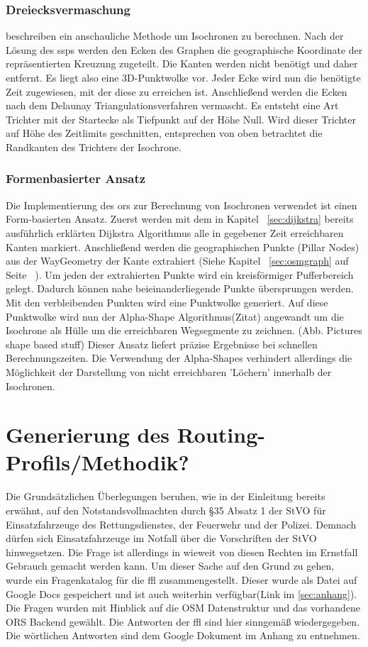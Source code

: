 \documentclass[12pt,a4paper]{article}
\begin{document}
\subsubsection{Dreiecksvermaschung}
\cite{isochrones} beschreiben ein anschauliche Methode um Isochronen zu berechnen. 
Nach der Lösung des \gls{ssp}s werden den Ecken des Graphen die geographische Koordinate der repräsentierten Kreuzung zugeteilt. Die Kanten werden nicht benötigt und daher entfernt. 
Es liegt also eine 3D-Punktwolke vor. 
Jeder Ecke wird nun die benötigte Zeit zugewiesen, mit der diese zu erreichen ist. 
Anschließend werden die Ecken nach dem Delaunay Triangulationsverfahren vermascht. 
Es entsteht eine Art Trichter mit der Startecke als Tiefpunkt auf der Höhe Null. 
Wird dieser Trichter auf Höhe des Zeitlimits geschnitten, entsprechen von oben betrachtet die Randkanten des Trichters der Isochrone.


\subsubsection{Formenbasierter Ansatz}
Die Implementierung des \gls{ors} zur Berechnung von Isochronen verwendet ist einen Form-basierten Ansatz. Zuerst werden mit dem in Kapitel ~\ref{sec:dijkstra} bereits ausführlich erklärten Dijkstra Algorithmus alle in gegebener Zeit erreichbaren Kanten markiert. Anschließend werden die geographischen Punkte (Pillar Nodes) aus der WayGeometry der Kante extrahiert (Siehe Kapitel ~\ref{sec:osmgraph} auf Seite ~\pageref{sec:osmgraph}). Um jeden der extrahierten Punkte wird ein kreisförmiger Pufferbereich gelegt. Dadurch können nahe beieinanderliegende Punkte übersprungen werden. Mit den verbleibenden Punkten wird eine Punktwolke generiert. Auf diese Punktwolke wird nun der Alpha-Shape Algorithmus(Zitat) angewandt um die Isochrone als Hülle um die erreichbaren Wegsegmente zu zeichnen.
(Abb. Pictures shape based stuff)
Dieser Ansatz liefert präzise Ergebnisse bei schnellen Berechnungszeiten. Die Verwendung der Alpha-Shapes verhindert allerdings die Möglichkeit der Darstellung von nicht erreichbaren 'Löchern' innerhalb der Isochronen.

\newpage
\section{Generierung des Routing-Profils/Methodik?}
Die Grundsätzlichen Überlegungen beruhen, wie in der Einleitung bereits erwähnt, auf den Notstandsvollmachten durch §35 Absatz 1 der StVO für Einsatzfahrzeuge des Rettungsdienstes, der Feuerwehr und der Polizei. Demnach dürfen sich Einsatzfahrzeuge im Notfall über die Vorschriften der StVO hinwegsetzen. Die Frage ist allerdings in wieweit von diesen Rechten im Ernstfall Gebrauch gemacht werden kann. Um dieser Sache auf den Grund zu gehen, wurde ein Fragenkatalog für die \gls{ffl} zusammengestellt. Dieser wurde als Datei auf Google Docs gespeichert und ist auch weiterhin verfügbar(Link im \ref{sec:anhang}). Die Fragen wurden mit Hinblick auf die OSM Datenstruktur und das vorhandene ORS Backend gewählt. Die Antworten der \gls{ffl} sind hier sinngemäß wiedergegeben. Die wörtlichen Antworten sind dem Google Dokument im Anhang zu entnehmen.
\end{document}
